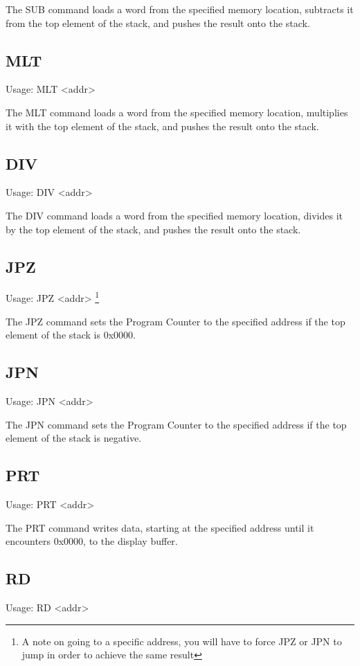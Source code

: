 \documentclass{book}
\begin{document}
  The SUB command loads a word from the specified memory location, subtracts it from the top
  element of the stack, and pushes the result onto the stack.

\subsection{MLT}
  Usage: MLT \textless addr\textgreater 

  The MLT command loads a word from the specified memory location, multiplies it with the top
  element of the stack, and pushes the result onto the stack.

\subsection{DIV}
  Usage: DIV \textless addr\textgreater 

  The DIV command loads a word from the specified memory location, divides it by the top element
  of the stack, and pushes the result onto the stack.

\subsection{JPZ}
  Usage: JPZ \textless addr\textgreater
\footnote{A note on going to a specific address, you will have to force JPZ or
JPN to jump in order to achieve the same result}

  The JPZ command sets the Program Counter to the specified address if the top element of the
  stack is 0x0000.

\subsection{JPN}
  Usage: JPN \textless addr\textgreater 

  The JPN command sets the Program Counter to the specified address if the top element of the
  stack is negative.

\subsection{PRT}
  Usage: PRT \textless addr\textgreater 

  The PRT command writes data, starting at the specified address until it encounters 0x0000, to
  the display buffer.

\subsection{RD}
  Usage: RD \textless addr\textgreater 
\end{document}
